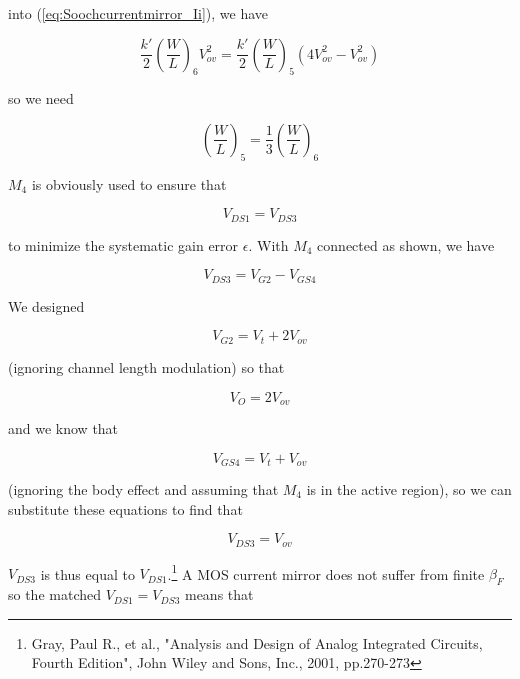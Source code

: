 into (\ref{eq:Soochcurrentmirror_Ii}), we have

\begin{equation}
\frac{k'}{2}\left(\frac{W}{L}\right)_{6}V_{ov}^{2} = \frac{k'}{2}\left(\frac{W}{L}\right)_{5}(4V_{ov}^{2}-V_{ov}^{2})
\end{equation}

so we need

\begin{equation}
(\frac{W}{L})_{5} = \frac{1}{3}(\frac{W}{L})_{6}
\end{equation}

\par
$M_{4}$ is obviously used to ensure that

\begin{equation}
V_{DS1} = V_{DS3}
\end{equation}

to minimize the systematic gain error $\epsilon$. With $M_{4}$ connected as shown, we have

\begin{equation}
V_{DS3} = V_{G2} - V_{GS4}
\end{equation}

We designed

\begin{equation}
V_{G2} = V_{t} + 2V_{ov}
\end{equation}

(ignoring channel length modulation) so that

\begin{equation}
V_{O} = 2V_{ov}
\end{equation}

and we know that

\begin{equation}
V_{GS4} = V_{t} + V_{ov}
\end{equation}

(ignoring the body effect and assuming that $M_{4}$ is in the active region), so we can substitute these equations to find that

\begin{equation}
V_{DS3} = V_{ov}
\end{equation}

$V_{DS3}$ is thus equal to $V_{DS1}$.\footnote{Gray, Paul R., et al., "Analysis and Design of Analog Integrated Circuits, Fourth Edition", John Wiley and Sons, Inc., 2001, pp.270-273} A MOS current mirror does not suffer from finite $\beta_{F}$ so the matched $V_{DS1} = V_{DS3}$ means that

